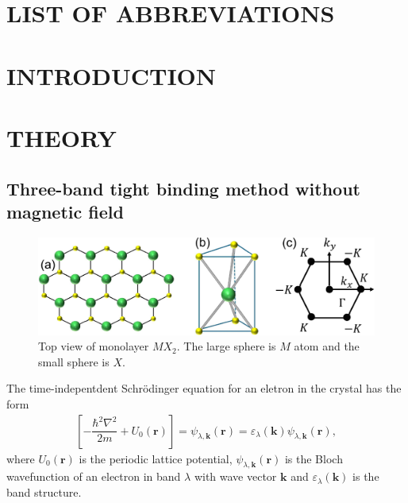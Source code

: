 \documentclass{report}
\newcommand{\f}[2]{\dfrac{#1}{#2}}
\begin{document}
\chapter*{\MakeUppercase{List of Abbreviations}}
\begin{acronym} %
\end{acronym}
\newpage
{}
\chapter{\textbf{INTRODUCTION}}
\chapter{\textbf{THEORY}}
\section{Three-band tight binding method without magnetic field}
\begin{figure}[H]
	\centering
	\includegraphics[width=1.02\textwidth,height=0.3\linewidth]{pic/lattice_crop.pdf}
	\caption[TMD structure and its first Brillouin zone]{\label{fig:Lattice} Top view of monolayer $MX_{2}$. The large sphere is $M$ atom and the small sphere is $X$.}
\end{figure}
The time-indepentdent Schr\"{o}dinger equation for an eletron in the crystal has the form
\begin{gather}
	\left[-\f{\hbar^{2} \nabla^{2}}{2m} + U_{0}(\mathbf{r})\right] = \psi_{\lambda,\mathbf{k}}(\mathbf{r}) = \varepsilon_{\lambda}(\mathbf{k}) \psi_{\lambda,\mathbf{k}}(\mathbf{r}),
\end{gather}
where $U_{0}(\mathbf{r})$ is the periodic lattice potential, $\psi_{\lambda,\mathbf{k}}(\mathbf{r})$ is the Bloch wavefunction of an electron in band $\lambda$ with wave vector $\mathbf{k}$ and $\varepsilon_{\lambda}(\mathbf{k})$ is the band structure.
\end{document}
